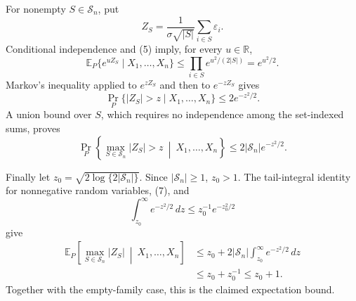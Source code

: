 For nonempty \(S\in\mathscr S_n\), put
\[
 Z_S=\frac1{\sigma\sqrt{|S|}}\sum_{i\in S}\varepsilon_i.
\]
Conditional independence and (5) imply, for every \(u\in\mathbb R\),
\[
 \mathbb E_P\{e^{uZ_S}\mid X_1,\ldots,X_n\}
 \le\prod_{i\in S}e^{u^2/(2|S|)}=e^{u^2/2}. \tag{6}
\]
Markov's inequality applied to \(e^{zZ_S}\) and then to \(e^{-zZ_S}\) gives
\[
 \Pr_P\{|Z_S|>z\mid X_1,\ldots,X_n\}\le2e^{-z^2/2}.
\]
A union bound over \(S\), which requires no independence among the set-indexed sums, proves
\[
 \Pr_P\left\{\max_{S\in\mathscr S_n}|Z_S|>z
 \ \middle|\ X_1,\ldots,X_n\right\}
 \le2|\mathscr S_n|e^{-z^2/2}. \tag{7}
\]

Finally let \(z_0=\sqrt{2\log\{2|\mathscr S_n|\}}\).  Since \(|\mathscr S_n|\ge1\), \(z_0>1\).  The tail-integral identity for nonnegative random variables, (7), and
\[
 \int_{z_0}^{\infty}e^{-z^2/2}\,dz\le z_0^{-1}e^{-z_0^2/2}
\]
give
\[
 \begin{aligned}
 \mathbb E_P\left[\max_{S\in\mathscr S_n}|Z_S|
 \ \middle|\ X_1,\ldots,X_n\right]
 &\le z_0+2|\mathscr S_n|\int_{z_0}^{\infty}e^{-z^2/2}\,dz\\
 &\le z_0+z_0^{-1}\le z_0+1.
 \end{aligned}
\]
Together with the empty-family case, this is the claimed expectation bound.